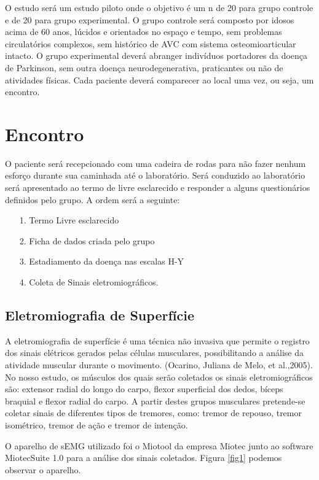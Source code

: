 \documentclass[a4paper,12pt]{report}
\begin{document}
O estudo será um estudo piloto onde o objetivo é um n de 20 para grupo controle e de 20 para grupo experimental. O grupo controle será composto por idosos acima de 60 anos, lúcidos e orientados no espaço e tempo, sem problemas circulatórios complexos, sem histórico de AVC com sistema osteomioarticular intacto. O grupo experimental deverá abranger indivíduos portadores da doença de Parkinson, sem outra doença neurodegenerativa, praticantes ou não de atividades físicas. Cada paciente deverá comparecer ao local uma vez, ou seja, um encontro.

\section*{Encontro}
O paciente será recepcionado com uma cadeira de rodas para não fazer nenhum esforço durante sua caminhada até o laboratório. Será conduzido ao laboratório será apresentado ao termo de livre esclarecido e responder a alguns questionários definidos pelo grupo. A ordem será a seguinte:

\begin{itemize}
\item[1.] Termo Livre esclarecido
\item[2.] Ficha de dados criada pelo grupo
\item[3.] Estadiamento da doença nas escalas H-Y
\item[4.] Coleta de Sinais eletromiográficos.
\end{itemize}


\subsection*{Eletromiografia de Superfície}
A eletromiografia de superfície é uma técnica não invasiva que permite o registro dos sinais elétricos gerados pelas células musculares, possibilitando a análise da atividade muscular durante o movimento. (Ocarino, Juliana de Melo, et al.,2005). No nosso estudo, os músculos dos quais serão coletados os sinais eletromiográficos são: extensor radial do longo do carpo, flexor superficial dos dedos, bíceps braquial e flexor radial do carpo. A partir destes grupos musculares pretende-se coletar sinais de diferentes tipos de tremores, como: tremor de repouso, tremor isométrico, tremor de ação e tremor de intenção.

O aparelho de sEMG utilizado foi o Miotool da empresa Miotec junto ao software MiotecSuite 1.0 para a análise dos sinais coletados. Figura \ref{fig1} podemos observar o aparelho.
\end{document}
